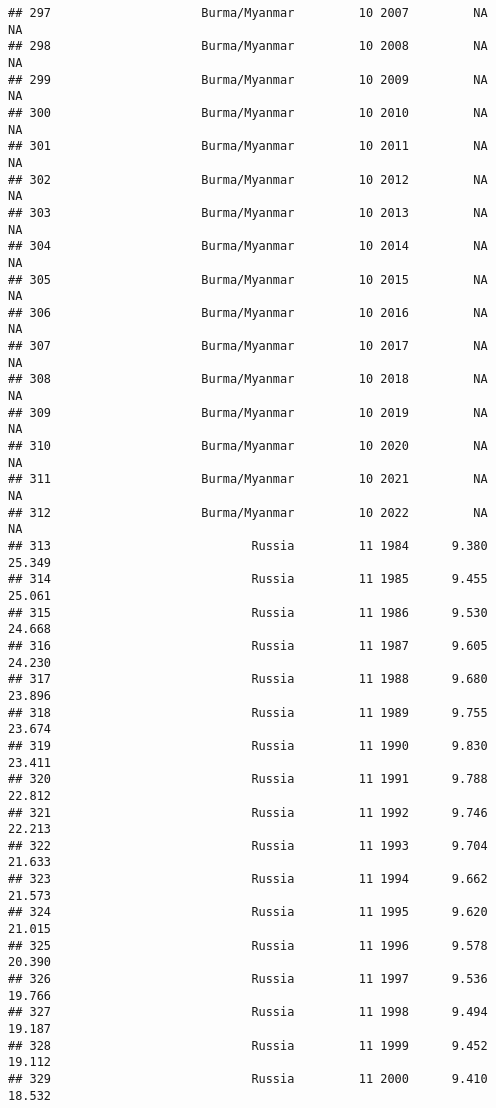 \documentclass[
]{article}
\begin{document}
\begin{verbatim}
## 297                     Burma/Myanmar         10 2007         NA         NA
## 298                     Burma/Myanmar         10 2008         NA         NA
## 299                     Burma/Myanmar         10 2009         NA         NA
## 300                     Burma/Myanmar         10 2010         NA         NA
## 301                     Burma/Myanmar         10 2011         NA         NA
## 302                     Burma/Myanmar         10 2012         NA         NA
## 303                     Burma/Myanmar         10 2013         NA         NA
## 304                     Burma/Myanmar         10 2014         NA         NA
## 305                     Burma/Myanmar         10 2015         NA         NA
## 306                     Burma/Myanmar         10 2016         NA         NA
## 307                     Burma/Myanmar         10 2017         NA         NA
## 308                     Burma/Myanmar         10 2018         NA         NA
## 309                     Burma/Myanmar         10 2019         NA         NA
## 310                     Burma/Myanmar         10 2020         NA         NA
## 311                     Burma/Myanmar         10 2021         NA         NA
## 312                     Burma/Myanmar         10 2022         NA         NA
## 313                            Russia         11 1984      9.380     25.349
## 314                            Russia         11 1985      9.455     25.061
## 315                            Russia         11 1986      9.530     24.668
## 316                            Russia         11 1987      9.605     24.230
## 317                            Russia         11 1988      9.680     23.896
## 318                            Russia         11 1989      9.755     23.674
## 319                            Russia         11 1990      9.830     23.411
## 320                            Russia         11 1991      9.788     22.812
## 321                            Russia         11 1992      9.746     22.213
## 322                            Russia         11 1993      9.704     21.633
## 323                            Russia         11 1994      9.662     21.573
## 324                            Russia         11 1995      9.620     21.015
## 325                            Russia         11 1996      9.578     20.390
## 326                            Russia         11 1997      9.536     19.766
## 327                            Russia         11 1998      9.494     19.187
## 328                            Russia         11 1999      9.452     19.112
## 329                            Russia         11 2000      9.410     18.532

\end{verbatim}
\end{document}
